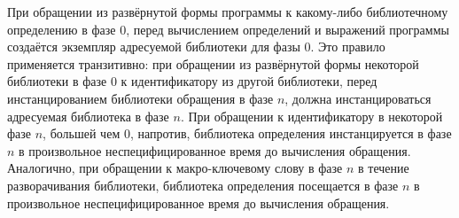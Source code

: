 При обращении из развёрнутой формы программы к какому-либо библиотечному определению в фазе $0$,
перед вычислением определений и выражений программы создаётся экземпляр адресуемой библиотеки
для фазы $0$. Это правило применяется транзитивно: при обращении из развёрнутой формы некоторой
библиотеки в фазе $0$ к идентификатору из другой библиотеки, перед инстанцированием библиотеки
обращения в фазе $n$, должна инстанцироваться адресуемая библиотека в фазе $n$. При обращении к
идентификатору в некоторой фазе $n$, большей чем $0$, напротив, библиотека определения
инстанцируется в фазе $n$ в произвольное неспецифицированное время до вычисления
обращения. Аналогично, при обращении к макро-ключевому слову в фазе $n$ в течение разворачивания
библиотеки, библиотека определения посещается в фазе $n$ в произвольное неспецифицированное
время до вычисления обращения.

